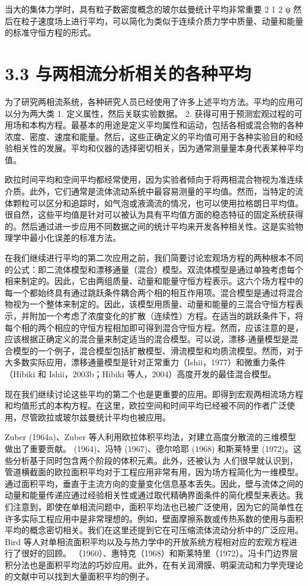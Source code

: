 \documentclass[11pt,a4paper,openany,fontset=none]{ctexbook}
\begin{document}
当大的集体力学时，具有粒子数密度概念的玻尔兹曼统计平均非常重要
2 1 2 ψ 然后在粒子速度场上进行平均，可以简化为类似于连续介质力学中质量、动量和能量的标准守恒方程的形式。

\section*{3.3 与两相流分析相关的各种平均}
为了研究两相流系统，各种研究人员已经使用了许多上述平均方法。平均的应用可以分为两大类
1. 定义属性，然后关联实验数据。 2. 获得可用于预测宏观过程的可用场和本构方程。最基本的用途是定义平均属性和运动，包括各相或混合物的各种浓度、密度、速度和能量。然后，这些正确定义的平均值可用于各种实验目的和经验相关性的发展。平均和仪器的选择密切相关，因为通常测量量本身代表某种平均值。

欧拉时间平均和空间平均都经常使用，因为实验者倾向于将两相混合物视为准连续介质。此外，它们通常是流体流动系统中最容易测量的平均值。然而，当特定的流体颗粒可以区分和追踪时，如气泡或液滴流的情况，也可以使用拉格朗日平均值。很自然，这些平均值是针对可以被认为具有平均值方面的稳态特征的固定系统获得的。然后通过进一步应用不同数据之间的统计平均来开发各种相关性。这是实验物理学中最小化误差的标准方法。

在我们继续进行平均的第二次应用之前，我们简要讨论宏观场方程的两种根本不同的公式：即二流体模型和漂移通量（混合）模型。双流体模型是通过单独考虑每个相来制定的。因此，它由两组质量、动量和能量守恒方程表示。这六个场方程中的每一个都始终具有通过跳跃条件耦合两个相的相互作用项。混合模型是通过将混合物视为一个整体来制定的。因此，该模型用质量、动量和能量的三混合守恒方程表示，并附加一个考虑了浓度变化的扩散（连续性）方程。在适当的跳跃条件下，将每个相的两个相应的守恒方程相加即可得到混合守恒方程。然而，应该注意的是，应该根据正确定义的混合量来制定适当的混合模型。可以说，漂移-通量模型是混合模型的一个例子，混合模型包括扩散模型、滑流模型和均质流模型。然而，对于大多数实际应用，漂移通量模型是针对正常重力（Ishii，1977）和微重力条件（Hibiki 和 Ishii，2003b；Hibiki 等人，2004）高度开发的最佳混合模型。

现在我们继续讨论这些平均的第二个也是更重要的应用。即得到宏观两相流场方程和均值形式的本构方程。在这里，欧拉空间和时间平均已经被不同的作者广泛使用，尽管欧拉或玻尔兹曼统计平均也被应用。

Zuber (1964a)、Zuber 等人利用欧拉体积平均法，对建立高度分散流的三维模型做出了重要贡献。 (1964)、冯特 (1967)、德尔哈耶 (1968) 和斯莱特里 (1972)。这些分析基于同时包含两个阶段的体积元素。此外，还被认为
人们很早就认识到，管道横截面的欧拉面积平均对于工程应用非常有用，因为场方程简化为一维模型。通过面积平均，垂直于主流方向的变量变化信息基本丢失。因此，壁与流体之间的动量和能量传递应通过经验相关性或通过取代精确界面条件的简化模型来表达。我们注意到，即使在单相流问题中，面积平均法也已被广泛使用，因为它的简单性在许多实际工程应用中是非常理想的。例如，壁面摩擦系数或传热系数的使用与面积平均的概念密切相关。我们在这里还提到它在可压缩流体流动分析中的广泛应用。 Bird 等人对单相流面积平均以及与热力学中的开放系统方程相对应的宏观方程进行了很好的回顾。 （1960）、惠特克（1968）和斯莱特里（1972）。冯卡门边界层积分法也是面积平均法的巧妙应用。此外，在有关润滑膜、明渠流动和力学壳理论的文献中可以找到大量面积平均的例子。
\end{document}
